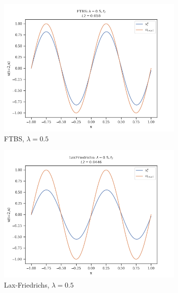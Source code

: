 \begin{figure}
    \centering
    \begin{subfigure}{0.3\linewidth}
        \centering
        \includegraphics[width=\linewidth]{figures/FTBS/FTBS_lambda=0.5,f2}
        \caption{FTBS, $\lambda = 0.5$}
    \end{subfigure}
    \hfill
    \begin{subfigure}{0.3\linewidth}
        \centering
        \includegraphics[width=\linewidth]{figures/LaxFriedrichs/LaxFriedrichs_lambda=0.5,f2}
        \caption{Lax-Friedrichs, $\lambda =0.5$}
    \end{subfigure}
    \hfill
    \begin{subfigure}{0.3\linewidth}

\end{subfigure}
\end{figure}

